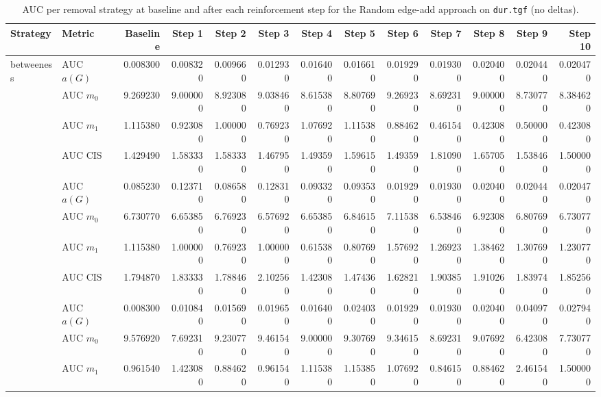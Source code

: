 \begin{table}[htbp]
  \centering
  \caption{AUC per removal strategy at baseline and after each reinforcement step for the Random edge-add approach on \texttt{dur.tgf} (no deltas).}
  \label{tab:dur-random_add-auc}
\setlength{\tabcolsep}{2.5pt}
  \begin{tabular}{llrrrrrrrrrrr}
    \toprule
    \textbf{Strategy} & \textbf{Metric} & \textbf{Baseline} & \textbf{Step 1} & \textbf{Step 2} & \textbf{Step 3} & \textbf{Step 4} & \textbf{Step 5} & \textbf{Step 6} & \textbf{Step 7} & \textbf{Step 8} & \textbf{Step 9} & \textbf{Step 10} \\
    \midrule
    \multirow{4}{*}{betweeness} & AUC $a(G)$ & 0.008300 & 0.008320 & 0.009660 & 0.012930 & 0.016400 & 0.016610 & 0.019290 & 0.019300 & 0.020400 & 0.020440 & 0.020470 \\
    & AUC $m_0$ & 9.269230 & 9.000000 & 8.923080 & 9.038460 & 8.615380 & 8.807690 & 9.269230 & 8.692310 & 9.000000 & 8.730770 & 8.384620 \\
    & AUC $m_1$ & 1.115380 & 0.923080 & 1.000000 & 0.769230 & 1.076920 & 1.115380 & 0.884620 & 0.461540 & 0.423080 & 0.500000 & 0.423080 \\
    & AUC CIS & 1.429490 & 1.583330 & 1.583330 & 1.467950 & 1.493590 & 1.596150 & 1.493590 & 1.810900 & 1.657050 & 1.538460 & 1.500000 \\
    \addlinespace
    \multirow{4}{*}{closeness} & AUC $a(G)$ & 0.085230 & 0.123710 & 0.086580 & 0.128310 & 0.093320 & 0.093530 & 0.019290 & 0.019300 & 0.020400 & 0.020440 & 0.020470 \\
    & AUC $m_0$ & 6.730770 & 6.653850 & 6.769230 & 6.576920 & 6.653850 & 6.846150 & 7.115380 & 6.538460 & 6.923080 & 6.807690 & 6.730770 \\
    & AUC $m_1$ & 1.115380 & 1.000000 & 0.769230 & 1.000000 & 0.615380 & 0.807690 & 1.576920 & 1.269230 & 1.384620 & 1.307690 & 1.230770 \\
    & AUC CIS & 1.794870 & 1.833330 & 1.788460 & 2.102560 & 1.423080 & 1.474360 & 1.628210 & 1.903850 & 1.910260 & 1.839740 & 1.852560 \\
    \addlinespace
    \multirow{4}{*}{core influence} & AUC $a(G)$ & 0.008300 & 0.010840 & 0.015690 & 0.019650 & 0.016400 & 0.024030 & 0.019290 & 0.019300 & 0.020400 & 0.040970 & 0.027940 \\
    & AUC $m_0$ & 9.576920 & 7.692310 & 9.230770 & 9.461540 & 9.000000 & 9.307690 & 9.346150 & 8.692310 & 9.076920 & 6.423080 & 7.730770 \\
    & AUC $m_1$ & 0.961540 & 1.423080 & 0.884620 & 0.961540 & 1.115380 & 1.153850 & 1.076920 & 0.846150 & 0.884620 & 2.461540 & 1.500000 \\

\end{tabular}
\end{table}
